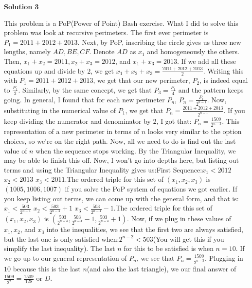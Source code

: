 \begin{enumerate}
 



\textbf{Solution 3}

This problem is a PoP(Power of Point) Bash exercise. What I did to solve this problem was look at recursive perimeters. The first ever perimeter is $P_1 = 2011 + 2012 + 2013$. Next, by PoP, inscribing the circle gives us three new lengths, namely $AD, BE, CF$. Denote $AD$ as $x_1$ and homogeneously the others. Then, $x_1 + x_2 = 2011, x_2 + x_3 = 2012$, and $x_1 + x_3 = 2013$. If we add all these equations up and divide by $2$, we get $x_1 + x_2 + x_3 = \frac{2011 + 2012 + 2013}{2}$. Writing this with $P_1 = 2011 + 2012 + 2013$, we get that our new perimeter, $P_2$, is indeed equal to $\frac{P_1}{2}$. Similarly, by the same concept, we get that $P_3 = \frac{P_1}{4}$ and the pattern keeps going. In general, I found that for each new perimeter $P_n$, $P_n = \frac{P_1}{2^{n-1}}$. Now, substituting in the numerical value of $P_1$, we get that $P_n = \frac{2011 + 2012 + 2013}{2^{n-1}}$. If you keep dividing the numerator and denominator by 2, I got that: $P_n = \frac{1509}{2^{n-3}}$. This representation of a new perimeter in terms of $n$ looks very similar to the option choices, so we're on the right path. Now, all we need to do is find out the last value of $n$ when the sequence stops working. By the Triangular Inequality, we may be able to finish this off. Now, I won't go into depths here, but listing out terms and using the Triangular Inequality gives us:First Sequence:$x_1 < 2012$
$x_2 < 2013$
$x_3 < 2011$.The ordered triple for this set of $(x_1, x_2, x_3)$ is $(1005, 1006, 1007)$ if you solve the PoP system of equations we got earlier. If you keep listing out terms, we can come up with the general form, and that is:$x_1 < \frac{503}{2^{n-4}}$
$x_2 < \frac{503}{2^{n-4}} + 1$
$x_3 < \frac{503}{2^{n-4}} - 1$.The ordered triple for this set of $(x_1, x_2, x_3)$ is $(\frac{503}{2^{n-4}}, \frac{503}{2^{n-4}} - 1, \frac{503}{2^{n-4}} + 1)$. Now, if we plug in these values of $x_1, x_2$, and $x_3$ into the inequalities, we see that the first two are always satisfied, but the last one is only satisfied when:$2^{n-2} < 503$(You will get this if you simplify the last inequality). The last $n$ for this to be satisfied is when $n = 10$. If we go up to our general representation of $P_n$, we see that $P_n = \frac{1509}{2^{n-3}}$. Plugging in $10$ because this is the last $n$(and also the last triangle), we our final answer of $\frac{1509}{2^{7}} = \boxed{\frac{1509}{128}}$ or $\boxed{D}$.


\end{enumerate}

